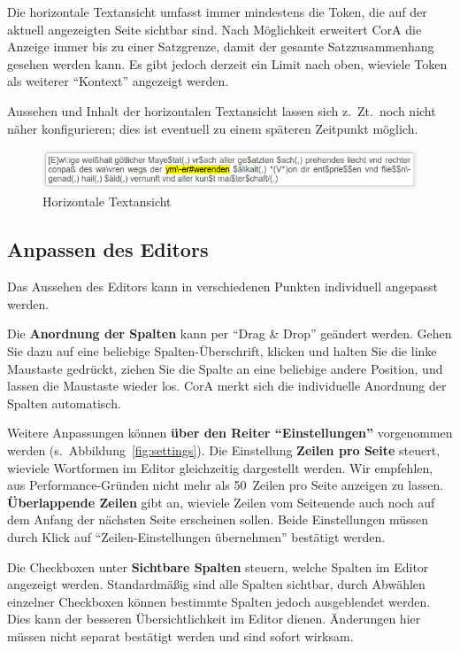 \documentclass[11pt,a4paper,parskip=half]{scrartcl}
\begin{document}
Die horizontale Textansicht umfasst immer mindestens die Token, die
auf der aktuell angezeigten Seite sichtbar sind.  Nach Möglichkeit
erweitert CorA die Anzeige immer bis zu einer Satzgrenze, damit der
gesamte Satzzusammenhang gesehen werden kann.  Es gibt jedoch derzeit
ein Limit nach oben, wieviele Token als weiterer "`Kontext"' angezeigt
werden.

Aussehen und Inhalt der horizontalen Textansicht lassen sich z.~Zt.\
noch nicht näher konfigurieren; dies ist eventuell zu einem späteren
Zeitpunkt möglich.

\begin{figure}
  \centering
  \includegraphics[width=0.8\linewidth]{img/textpreview.png}
  \caption{Horizontale Textansicht}
  \label{fig:horizontal}
\end{figure}


\subsection{Anpassen des Editors}
\label{sec:anpassen}

Das Aussehen des Editors kann in verschiedenen Punkten individuell
angepasst werden.

Die \textbf{Anordnung der Spalten} kann per "`Drag \& Drop"' geändert
werden.  Gehen Sie dazu auf eine beliebige Spalten-Überschrift,
klicken und halten Sie die linke Maustaste gedrückt, ziehen Sie die
Spalte an eine beliebige andere Position, und lassen die Maustaste
wieder los.  CorA merkt sich die individuelle Anordnung der Spalten
automatisch.

Weitere Anpassungen können \textbf{über den Reiter "`Einstellungen"'}
vorgenommen werden (s.\ Abbildung~\ref{fig:settings}).  Die
Einstellung \textbf{Zeilen pro Seite} steuert, wieviele Wortformen im
Editor gleichzeitig dargestellt werden.  Wir empfehlen, aus
Performance-Gründen nicht mehr als 50~Zeilen pro Seite anzeigen zu
lassen.  \textbf{Überlappende Zeilen} gibt an, wieviele Zeilen vom
Seitenende auch noch auf dem Anfang der nächsten Seite erscheinen
sollen.  Beide Einstellungen müssen durch Klick auf
"`Zeilen-Einstellungen übernehmen"' bestätigt werden.

Die Checkboxen unter \textbf{Sichtbare Spalten} steuern, welche
Spalten im Editor angezeigt werden.  Standardmäßig sind alle Spalten
sichtbar, durch Abwählen einzelner Checkboxen können bestimmte Spalten
jedoch ausgeblendet werden.  Dies kann der besseren Übersichtlichkeit
im Editor dienen.  Änderungen hier müssen nicht separat bestätigt
werden und sind sofort wirksam.
\end{document}
